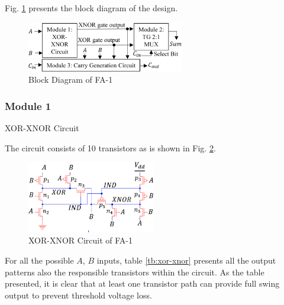 \documentclass[conference]{IEEEtran}
\begin{document}
Fig. \ref{fig:fa1-bd} presents the block diagram of the design.

\begin{figure}[!ht]
	\centering
	\includegraphics[width=2.7in]{fa1-block diagram.png}
	\caption{Block Diagram of FA-1}
	\label{fig:fa1-bd}
\end{figure}

\subsubsection{Module 1}XOR-XNOR Circuit

The circuit consists of 10 transistors as is shown in Fig. \ref{fig:fa1-xor-xnor}.

\begin{figure}[!ht]
	\centering
	\includegraphics[width=2.2in]{fa1-xor-xnor circuit.png}
	\caption{XOR-XNOR Circuit of FA-1}
	\label{fig:fa1-xor-xnor}
\end{figure}

For all the possible \(A\), \(B\) inputs,
table \ref{tb:xor-xnor} presents all the output patterns also the responsible transistors within the circuit.
As the table presented, it is clear that at least one transistor path can provide full swing output to prevent threshold voltage loss.
\end{document}
